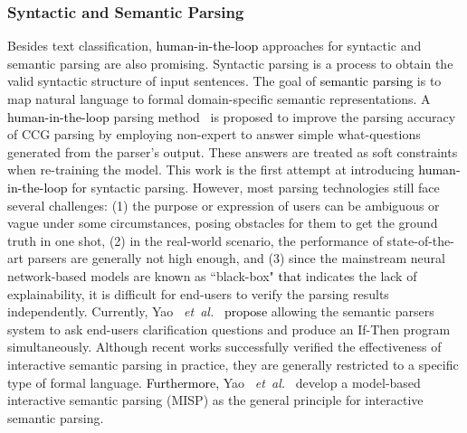 \documentclass{article}
\newcommand\etal{\emph{et~al.}}
\newcommand{\REO}[1]{\textcolor{black}{#1}}
\newcommand{\ZJH}[1]{\textcolor{black}{#1}}
\begin{document}
\subsubsection{Syntactic and Semantic Parsing}

Besides text classification, \REO{human-in-the-loop} approaches for syntactic and semantic parsing are also promising. Syntactic parsing is a process to obtain the valid syntactic structure of input sentences. The goal of \ZJH{semantic parsing} is to map natural language to formal domain-specific semantic representations. A \REO{human-in-the-loop} parsing method~\cite{he2016human} is proposed to improve the parsing accuracy of CCG parsing by employing non-expert to answer simple what-questions generated from the parser's output. These answers are treated as soft constraints when re-training the model. This work is the first attempt at introducing \REO{human-in-the-loop} for syntactic parsing. However, most parsing technologies still face several challenges: (1) the purpose or expression of users can be ambiguous or vague under some circumstances, posing obstacles for them to get the ground truth in one shot, (2) in the real-world scenario, the performance of state-of-the-art parsers are generally not high enough, and (3) since the mainstream neural network-based models are known as ``black-box" \ZJH{that} indicates the lack of explainability, it is difficult for end-users to verify the parsing results independently.
Currently, Yao~ \etal~\cite{yao2019interactive} \ZJH{propose} allowing the semantic parsers system to ask end-users clarification questions and produce an If-Then program simultaneously. Although recent works successfully verified the effectiveness of interactive semantic parsing in practice, they are generally restricted to a specific type of formal language.
\ZJH{Furthermore, }Yao~ \etal~\cite{yao2019model} develop a model-based interactive semantic parsing (MISP) as the general principle for interactive semantic parsing.
\end{document}
